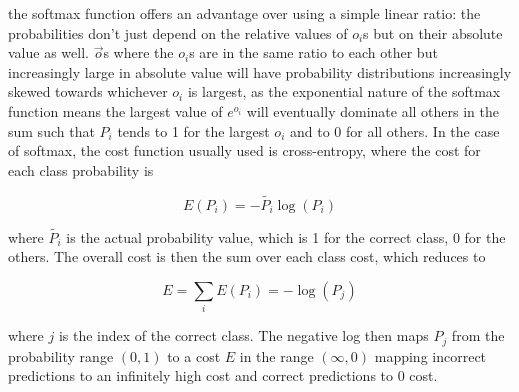 the softmax function offers an advantage over using a simple linear ratio: the probabilities don't just depend on the relative values of $o_{i}$s but on their absolute value as well. $\vec{o}$s where the $o_{i}$s are in the same ratio to each other but increasingly large in absolute value will have probability distributions increasingly skewed towards whichever $o_{i}$ is largest, as the exponential nature of the softmax function means the largest value of $e^{o_{i}}$ will eventually dominate all others in the sum such that $P_{i}$ tends to 1 for the largest $o_i$ and to 0 for all others. In the case of softmax, the cost function usually used is cross-entropy, where the cost for each class probability is 

\begin{equation}
E(P_{i}) = - \tilde{P_{i}} \log(P_{i}) 
\end{equation} 

where $\tilde{P_{i}} $ is the actual probability value, which is 1 for the correct class, 0 for the others. The overall cost is then the sum over each class cost, which reduces to 

\begin{equation}
E = \sum_{i} E(P_{i}) = - \log(P_{j}) 
\end{equation}

where $j$ is the index of the correct class. The negative log then maps $P_{j}$ from the probability range $(0,1)$ to a cost $E$ in the range $(\infty,0)$ mapping incorrect predictions to an infinitely high cost and correct predictions to 0 cost.